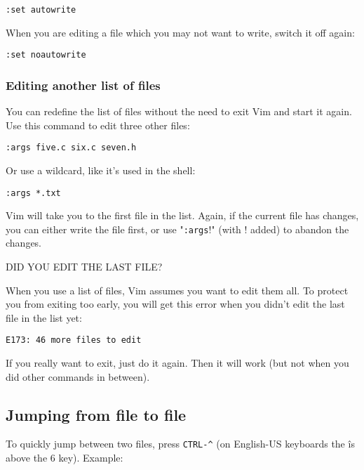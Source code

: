  \begin{Verbatim}[samepage=true]
 :set autowrite
 \end{Verbatim}

When you are editing a file which you may not want to write, switch it off again:

 \begin{Verbatim}[samepage=true]
 :set noautowrite
 \end{Verbatim}

\subsubsection{Editing another list of files}
You can redefine the list of files without the need to exit Vim and start it again.
Use this command to edit three other files:

 \begin{Verbatim}[samepage=true]
 :args five.c six.c seven.h
 \end{Verbatim}

Or use a wildcard, like it's used in the shell:

 \begin{Verbatim}[samepage=true]
 :args *.txt
 \end{Verbatim}

Vim will take you to the first file in the list.
Again, if the current file has changes, you can either write the file first, or use "\verb!:args!!" (with !  added) to abandon the changes.

DID YOU EDIT THE LAST FILE?
\label{arglist-quit}

When you use a list of files, Vim assumes you want to edit them all.
To protect you from exiting too early, you will get this error when you didn't edit the last file in the list yet:

		\begin{Verbatim}[samepage=true]
    E173: 46 more files to edit 
						\end{Verbatim}

If you really want to exit, just do it again.
Then it will work (but not when you did other commands in between).

\subsection{Jumping from file to file}
To quickly jump between two files, press \verb!CTRL-^!  (on English-US keyboards the \^  is above the 6 key).
Example:

